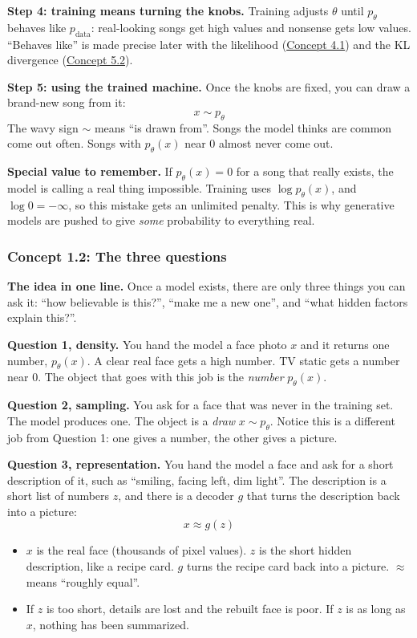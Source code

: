 \documentclass[12pt,a4paper]{article}
\begin{document}
\textbf{Step 4: training means turning the knobs.} Training adjusts $\theta$ until $p_\theta$ behaves like $p_{\text{data}}$: real-looking songs get high values and nonsense gets low values. ``Behaves like'' is made precise later with the likelihood (\hyperref[c4-1]{Concept 4.1}) and the KL divergence (\hyperref[c5-2]{Concept 5.2}).

\textbf{Step 5: using the trained machine.} Once the knobs are fixed, you can draw a brand-new song from it:
\[
x\sim p_\theta
\]
The wavy sign $\sim$ means ``is drawn from''. Songs the model thinks are common come out often. Songs with $p_\theta(x)$ near 0 almost never come out.

\textbf{Special value to remember.} If $p_\theta(x)=0$ for a song that really exists, the model is calling a real thing impossible. Training uses $\log p_\theta(x)$, and $\log 0=-\infty$, so this mistake gets an unlimited penalty. This is why generative models are pushed to give \emph{some} probability to everything real.

\subsubsection{Concept 1.2: The three questions}\label{c1-2}

\textbf{The idea in one line.} Once a model exists, there are only three things you can ask it: ``how believable is this?'', ``make me a new one'', and ``what hidden factors explain this?''.

\textbf{Question 1, density.} You hand the model a face photo $x$ and it returns one number, $p_\theta(x)$. A clear real face gets a high number. TV static gets a number near 0. The object that goes with this job is the \emph{number} $p_\theta(x)$.

\textbf{Question 2, sampling.} You ask for a face that was never in the training set. The model produces one. The object is a \emph{draw} $x\sim p_\theta$. Notice this is a different job from Question 1: one gives a number, the other gives a picture.

\textbf{Question 3, representation.} You hand the model a face and ask for a short description of it, such as ``smiling, facing left, dim light''. The description is a short list of numbers $z$, and there is a decoder $g$ that turns the description back into a picture:
\[
x\approx g(z)
\]
\begin{itemize}[nosep]
  \item $x$ is the real face (thousands of pixel values). $z$ is the short hidden description, like a recipe card. $g$ turns the recipe card back into a picture. $\approx$ means ``roughly equal''.
  \item If $z$ is too short, details are lost and the rebuilt face is poor. If $z$ is as long as $x$, nothing has been summarized.
\end{itemize}
\end{document}
